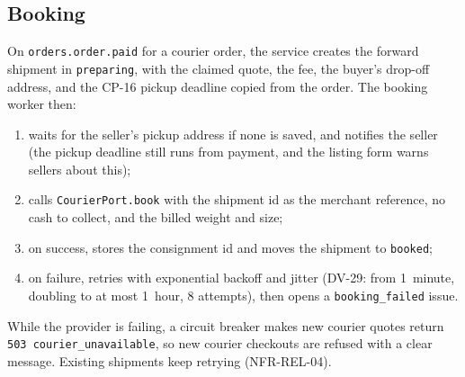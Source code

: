 \documentclass[11pt,a4paper]{article}
\begin{document}
\subsection{Booking}
\label{sec:booking}
On \texttt{orders.order.paid} for a courier order, the service creates the forward shipment in \texttt{preparing}, with the claimed quote, the fee, the buyer's drop-off address, and the CP-16 pickup deadline copied from the order. The booking worker then:
\begin{enumerate}[nosep]
  \item waits for the seller's pickup address if none is saved, and notifies the seller (the pickup deadline still runs from payment, and the listing form warns sellers about this);
  \item calls \texttt{CourierPort.book} with the shipment id as the merchant reference, no cash to collect, and the billed weight and size;
  \item on success, stores the consignment id and moves the shipment to \texttt{booked};
  \item on failure, retries with exponential backoff and jitter (DV-29: from 1~minute, doubling to at most 1~hour, 8 attempts), then opens a \texttt{booking\_failed} issue.
\end{enumerate}
While the provider is failing, a circuit breaker makes new courier quotes return \texttt{503 courier\_unavailable}, so new courier checkouts are refused with a clear message. Existing shipments keep retrying (NFR-REL-04).
\end{document}
